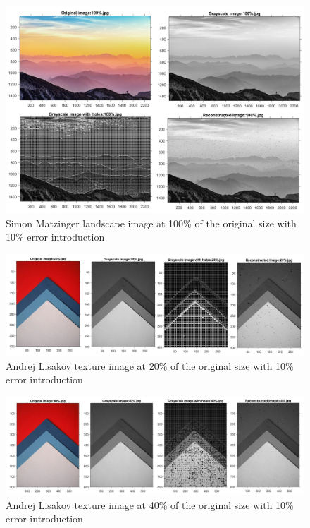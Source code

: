 \begin{figure}[!ht]
\center \includegraphics[scale=0.31]{SimonMatzinger100.jpg}
\caption{Simon Matzinger landscape image at 100\% of the original size with 10\% error introduction}
\label{fig:SimonMatzinger100}
\end{figure}




\begin{figure}[!ht]
\center \includegraphics[scale=0.31]{AndrejLisakov20.jpg}
\caption{Andrej Lisakov texture image at 20\% of the original size with 10\% error introduction}
\label{fig:AndrejLisakov20}
\end{figure}

\begin{figure}[!ht]
\center \includegraphics[scale=0.31]{AndrejLisakov40.jpg}
\caption{Andrej Lisakov texture image at 40\% of the original size with 10\% error introduction}
\label{fig:AndrejLisakov40}
\end{figure}

